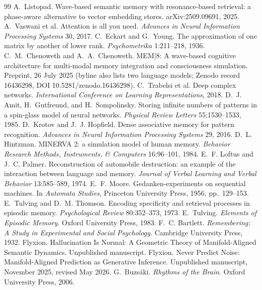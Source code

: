 \documentclass[11pt,twoside,openany]{book}
\theoremstyle{plain}
\theoremstyle{definition}
\theoremstyle{remark}
\theoremstyle{definition}
\begin{document}
\begin{thebibliography}{99}
 A.~Listopad. Wave-based semantic memory with resonance-based retrieval: a phase-aware alternative to vector embedding stores. arXiv:2509.09691, 2025.
 A.~Vaswani et al. Attention is all you need. \emph{Advances in Neural Information Processing Systems} 30, 2017.
 C.~Eckart and G.~Young. The approximation of one matrix by another of lower rank. \emph{Psychometrika} 1:211--218, 1936.
 C.~M.~Chenoweth and A.~A.~Chenoweth. MEM|8: A wave-based cognitive architecture for multi-modal memory integration and consciousness simulation. Preprint, 26 July 2025 (byline also lists two language models; Zenodo record 16436298, DOI 10.5281/zenodo.16436298).
 C.~Trabelsi et al. Deep complex networks. \emph{International Conference on Learning Representations}, 2018.
 D.~J. Amit, H.~Gutfreund, and H.~Sompolinsky. Storing infinite numbers of patterns in a spin-glass model of neural networks. \emph{Physical Review Letters} 55:1530--1533, 1985.
 D.~Krotov and J.~J. Hopfield. Dense associative memory for pattern recognition. \emph{Advances in Neural Information Processing Systems} 29, 2016.
 D.~L. Hintzman. MINERVA 2: a simulation model of human memory. \emph{Behavior Research Methods, Instruments, \& Computers} 16:96--101, 1984.
 E.~F. Loftus and J.~C. Palmer. Reconstruction of automobile destruction: an example of the interaction between language and memory. \emph{Journal of Verbal Learning and Verbal Behavior} 13:585--589, 1974.
 E.~F. Moore. Gedanken-experiments on sequential machines. In \emph{Automata Studies}, Princeton University Press, 1956, pp.~129--153.
 E.~Tulving and D.~M. Thomson. Encoding specificity and retrieval processes in episodic memory. \emph{Psychological Review} 80:352--373, 1973.
 E.~Tulving. \emph{Elements of Episodic Memory}. Oxford University Press, 1983.
 F.~C. Bartlett. \emph{Remembering: A Study in Experimental and Social Psychology}. Cambridge University Press, 1932.
 Flyxion. Hallucination Is Normal: A Geometric Theory of Manifold-Aligned Semantic Dynamics. Unpublished manuscript.
 Flyxion. Never Predict Noise: Manifold-Aligned Prediction as Generative Inference. Unpublished manuscript, November 2025, revised May 2026.
 G.~Buzs\'aki. \emph{Rhythms of the Brain}. Oxford University Press, 2006.

\end{thebibliography}
\end{document}
